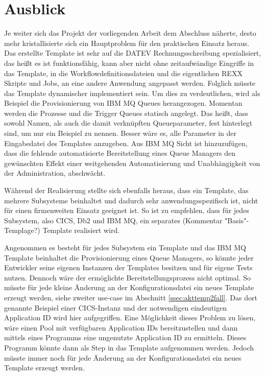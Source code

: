\chapter{Ausblick}\label{ch:ausblick}
Je weiter sich das Projekt der vorliegenden Arbeit dem Abschluss näherte, desto mehr kristallisierte sich ein Hauptproblem für den praktischen Einsatz heraus.
Das erstellte Template ist sehr auf die DATEV Rechnungsschreibung spezialisiert, das heißt es ist funktionsfähig, kann aber nicht ohne zeitaufwändige Eingriffe in das Template, in die Workflowdefinitionsdateien und die eigentlichen REXX Skripte und Jobs, an eine andere Anwendung angepasst werden. 
Folglich müsste das Template dynamischer implementiert sein.
Um dies zu verdeutlichen, wird als Beispiel die Provisionierung von IBM MQ Queues herangezogen.
Momentan werden die Prozesse und die Trigger Queues statisch angelegt.
Das heißt, dass sowohl Namen, als auch die damit verknüpften Queueparameter, fest hinterlegt sind, um nur ein Beispiel zu nennen.
Besser wäre es, alle Parameter in der Eingabedatei des Templates anzugeben.
Aus IBM MQ Sicht ist hinzuzufügen, dass die fehlende automatisierte Bereitstellung eines Queue Managers den gewünschten Effekt einer weitgehenden Automatisierung und Unabhängigkeit von der Administration, abschwächt.

Während der Realisierung stellte sich ebenfalls heraus, dass ein Template, das mehrere Subsysteme beinhaltet und dadurch sehr anwendungsspezifisch ist, nicht für einen firmenweiten Einsatz geeignet ist.
So ist zu empfehlen, dass für jedes Subsystem, also CICS, Db2 und IBM MQ, ein separates (Kommentar "Basis"-Templage?) Template realisiert wird.

Angenommen es besteht für jedes Subsystem ein Template und das IBM MQ Template beinhaltet die Provisionierung eines Queue Managers, so könnte jeder Entwickler seine eigenen Instanzen der Templates besitzen und für eigene Tests nutzen.
Dennoch wäre der ermöglichte Bereitstellungsprozess nicht optimal.
So müsste für jede kleine Änderung an der Konfigurationsdatei ein neues Template erzeugt werden, siehe zweiter use-case im Abschnitt \ref{ssec:akttemp2fall}.
Das dort genannte Beispiel einer CICS-Instanz und der notwendigen eindeutigen Application ID wird hier aufgegriffen.
Eine Möglichkeit dieses Problem zu lösen, wäre einen Pool mit verfügbaren Application IDs bereitzustellen und dann mittels eines Programms eine ungenutzte Application ID zu ermitteln.
Dieses Programm könnte dann als Step in das Template aufgenommen werden.
Jedoch müsste immer noch für jede Änderung an der Konfigurationsdatei ein neues Template erzeugt werden.

